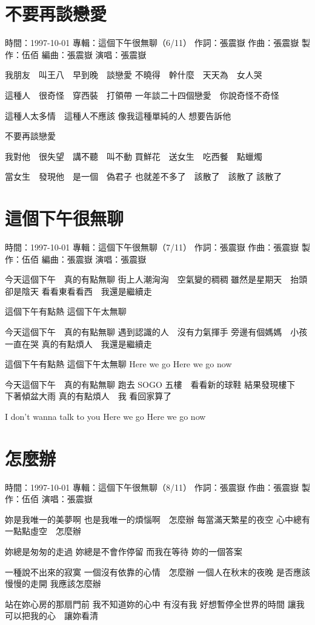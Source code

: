 \documentclass[UTF8,a4paper,oneside,twocolumn,12pt]{ctexbook}
\newcommand{\infopair}[2]{\textbullet #1：#2}
\newcommand{\zc}[1][伍佰]{\infopair{作詞}{#1}}
\newcommand{\zq}[1][伍佰]{\infopair{作曲}{#1}}
\newcommand{\bq}[1][伍佰]{\infopair{編曲}{#1}}
\newcommand{\zj}[1]{\infopair{專輯}{#1}}
\newcommand{\zz}[1]{\infopair{製作}{#1}}
\newcommand{\sj}[1]{\infopair{時間}{#1}}
\newenvironment{info}{\begin{flushleft}\kaishu
	}
	{\end{flushleft}\normalsize\yahei\par}
\newenvironment{lyric}{
	}
{}
\begin{document}
\section{不要再談戀愛}
\begin{info}
	\sj{1997-10-01}
	\zj{這個下午很無聊（6/11）}
	\zc[張震嶽]
	\zq[張震嶽]
	\zz{伍佰}
	\bq[張震嶽]
	\infopair{演唱}{張震嶽}
\end{info}
\begin{lyric}
	我朋友　叫王八　早到晚　談戀愛
	不曉得　幹什麼　天天為　女人哭

	這種人　很奇怪　穿西裝　打領帶
	一年談二十四個戀愛　你說奇怪不奇怪

	這種人太多情　這種人不應該
	像我這種單純的人 想要告訴他

	不要再談戀愛

	我對他　很失望　講不聽　叫不動
	買鮮花　送女生　吃西餐　點蠟燭

	當女生　發現他　是一個　偽君子
	也就差不多了　該散了　該散了 該散了
\end{lyric}

\section{這個下午很無聊}
\begin{info}
	\sj{1997-10-01}
	\zj{這個下午很無聊（7/11）}
	\zc[張震嶽]
	\zq[張震嶽]
	\zz{伍佰}
	\bq[張震嶽]
	\infopair{演唱}{張震嶽}
\end{info}
\begin{lyric}
	今天這個下午　真的有點無聊
	街上人潮洶洶　空氣變的稠稠
	雖然是星期天　抬頭卻是陰天
	看看東看看西　我還是繼續走

	這個下午有點熱 這個下午太無聊

	今天這個下午　真的有點無聊
	遇到認識的人　沒有力氣揮手
	旁邊有個媽媽　小孩一直在哭
	真的有點煩人　我還是繼續走

	這個下午有點熱 這個下午太無聊
	Here we go Here we go now

	今天這個下午　真的有點無聊
	跑去 SOGO 五樓　看看新的球鞋
	結果發現樓下　下著傾盆大雨
	真的有點煩人　我 看回家算了

	I don't wanna talk to you
	Here we go Here we go now
\end{lyric}

\section{怎麼辦}
\begin{info}
	\sj{1997-10-01}
	\zj{這個下午很無聊（8/11）}
	\zc[張震嶽]
	\zq[張震嶽]
	\zz{伍佰}
	\infopair{演唱}{張震嶽}
\end{info}
\begin{lyric}
	妳是我唯一的美夢啊
	也是我唯一的煩惱啊　怎麼辦
	每當滿天繁星的夜空
	心中總有一點點虛空　怎麼辦

	妳總是匆匆的走過
	妳總是不會作停留
	而我在等待
	妳的一個答案

	一種說不出來的寂寞
	一個沒有依靠的心情　怎麼辦
	一個人在秋末的夜晚
	是否應該慢慢的走開
	我應該怎麼辦

	站在妳心房的那扇門前
	我不知道妳的心中 有沒有我
	好想暫停全世界的時間
	讓我可以把我的心　讓妳看清
\end{lyric}
\end{document}
